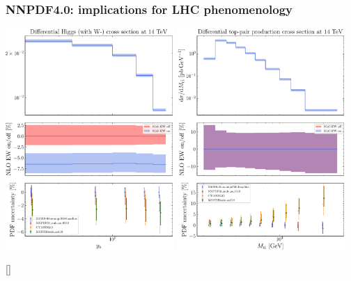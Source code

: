 \documentclass{beamer}
\begin{document}
\begin{frame}
 \frametitle{NNPDF4.0: implications for LHC phenomenology}
 \footnotesize
 \centering
 \vspace{0.2cm}
 \includegraphics[width=0.48\textwidth]{plots/NNPDF40_HIGGS_WM}
 \includegraphics[width=0.48\textwidth]{plots/NNPDF40_TTBAR}\\
 \begin{flushright}
  \tiny{[{\color{salmon}{Plots by courtesy of C.~Schwan}}]}
 \end{flushright}
\end{frame}
\end{document}
